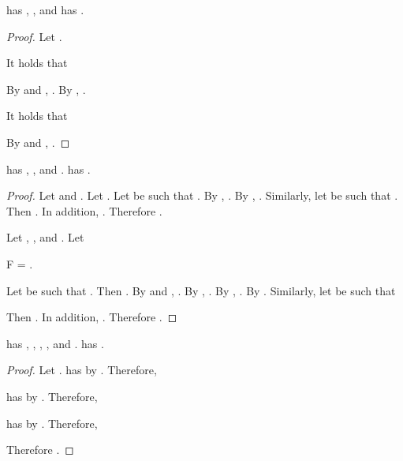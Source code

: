 \documentclass[b5paper, english, oneside]{memoir}
\begin{document}
\begin{theorem}
\label{SummationIsImplied}
 has , , and    has .
\end{theorem}

\begin{proof}
Let . 

\proofpart{} 
It holds that

By  and , . By , .

\proofpart{} 
It holds that

By  and , .

\end{proof}

\begin{theorem}
\label{MaximumSumIsImplied}
 has , , and .   has .
\end{theorem}

\begin{proof}
\proofpart{}
Let  and . Let . Let  be such that . By , . By , . Similarly, let  be such that . Then . In addition, . Therefore .

\proofpart{} 
Let , , and . Let
\begin{eqs}
F = . 
\end{eqs}
Let  be such that . Then . By  and , . By , . By , . By  . Similarly, let  be such that

Then . In addition, . Therefore .

\end{proof}

\begin{theorem}
\label{AdditivityIsImplied}
 has , , , , and .   has .
\end{theorem}

\begin{proof}
Let .  has  by . Therefore, 

 has  by . Therefore, 

 has  by . Therefore, 

Therefore .

\end{proof}
\end{document}
